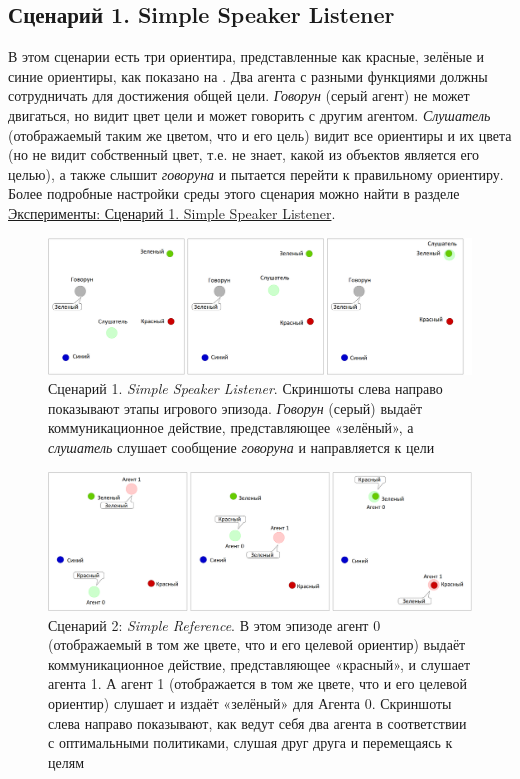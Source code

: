 \subsection{Сценарий 1. Simple Speaker Listener} \label{intro:ssl}

В этом сценарии есть три ориентира, представленные как красные, зелёные и синие ориентиры, как показано на . Два агента с разными функциями должны сотрудничать для достижения общей цели. \textit{Говорун} (серый агент) не может двигаться, но видит цвет цели и может говорить с другим агентом. \textit{Слушатель} (отображаемый таким же цветом, что и его цель) видит все ориентиры и их цвета (но не видит собственный цвет, т.е. не знает, какой из объектов является его целью), а также слышит \textit{говоруна} и пытается перейти к правильному ориентиру. Более подробные настройки среды этого сценария можно найти в разделе \hyperref[exp-ssl]{Эксперименты: Сценарий 1. Simple Speaker Listener}.

\begin{figure}[ht!]
    \center
    \includegraphics [scale=0.41] {my_folder/images/intro/ssl.png}
    \caption{Сценарий 1. \textit{Simple Speaker Listener}. Скриншоты слева направо показывают этапы игрового эпизода. \textit{Говорун} (серый) выдаёт коммуникационное действие, представляющее «зелёный», а \textit{слушатель} слушает сообщение \textit{говоруна} и направляется к цели}
    \label{fig-intro-ssl}
\end{figure}

\begin{figure}[ht!]
    \center
    \includegraphics [scale=0.38] {my_folder/images/intro/sr.png}
    \caption{Сценарий 2: \textit{Simple Reference}. В этом эпизоде агент 0 (отображаемый в том же цвете, что и его целевой ориентир) выдаёт коммуникационное действие, представляющее «красный», и слушает агента 1. А агент 1 (отображается в том же цвете, что и его целевой ориентир) слушает и издаёт «зелёный» для Агента 0. Скриншоты слева направо показывают, как ведут себя два агента в соответствии с оптимальными политиками, слушая друг друга и перемещаясь к целям}
    \label{fig-intro-sr}
\end{figure}

